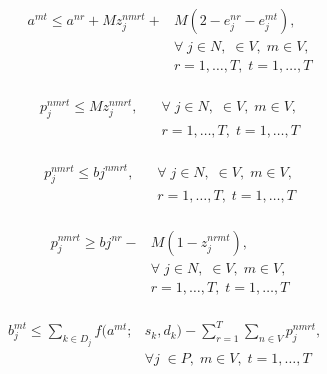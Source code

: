 \documentclass[conference]{IEEEtran}
\begin{document}
\begin{equation}
    \begin{split}
        a^{mt} \leq a^{nr} + Mz_{j}^{nmrt} +& M(2 - e_{j}^{nr} - e_{j}^{mt}),\\& \forall \; j \in N, \;  \in V, \; m \in V, \;\\&r=1, \dots, T, \; t=1, \dots, T\\\label{eq18}
    \end{split}
\end{equation}

\begin{equation}
    \begin{split}
        p_{j}^{nmrt} \leq Mz_{j}^{nmrt}, \;\;\;&\forall \; j \in N, \;  \in V, \; m \in V, \;\\&r=1, \dots, T, \; t=1, \dots, T\\ \label{eq19}
    \end{split}
\end{equation}


\begin{equation}
    \begin{split}
        p_{j}^{nmrt} \leq b{j}^{nmrt}, \;\;\;&\forall \; j \in N, \;  \in V, \; m \in V, \;\\&r=1, \dots, T, \; t=1, \dots, T\\ \label{eq20}
    \end{split}
\end{equation}

\begin{equation}
    \begin{split}
        p_{j}^{nmrt} \geq b{j}^{nr} - &M(1 - z_{j}^{nrmt}), \;\;\;\\&\forall \; j \in N, \;  \in V, \; m \in V, \;\\&r=1, \dots, T, \; t=1, \dots, T\\ \label{eq21}
    \end{split}
\end{equation}


\begin{equation}
    \begin{split}
        b_{j}^{mt} \leq \sum_{k \in D_{j}}f(a^{mt};& s_{k}, d_{k}) - \sum_{r=1}^{T}\sum_{n \in V} p_{j}^{nmrt},\;\;\;\\& \forall j\; \in P, \; m \in V, \; t=1, \dots, T\\ \label{eq22}
    \end{split}
\end{equation}
\end{document}
